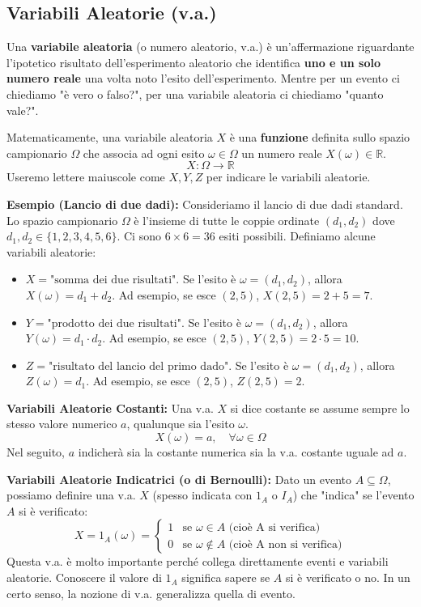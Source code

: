 \subsection{Variabili Aleatorie (v.a.)}
\begin{definition}
Una \textbf{variabile aleatoria} (o numero aleatorio, v.a.) è un'affermazione riguardante l'ipotetico risultato dell'esperimento aleatorio che identifica \textbf{uno e un solo numero reale} una volta noto l'esito dell'esperimento.
Mentre per un evento ci chiediamo "è vero o falso?", per una variabile aleatoria ci chiediamo "quanto vale?".

Matematicamente, una variabile aleatoria $X$ è una \textbf{funzione} definita sullo spazio campionario $\Omega$ che associa ad ogni esito $\omega \in \Omega$ un numero reale $X(\omega) \in \mathbb{R}$.
\[ X: \Omega \to \mathbb{R} \]
Useremo lettere maiuscole come $X, Y, Z$ per indicare le variabili aleatorie.
\end{definition}

\begin{example}
\textbf{Esempio (Lancio di due dadi):}
Consideriamo il lancio di due dadi standard. Lo spazio campionario $\Omega$ è l'insieme di tutte le coppie ordinate $(d_1, d_2)$ dove $d_1, d_2 \in \{1, 2, 3, 4, 5, 6\}$. Ci sono $6 \times 6 = 36$ esiti possibili.
Definiamo alcune variabili aleatorie:
\begin{itemize}
    \item $X = \text{"somma dei due risultati"}$.
    Se l'esito è $\omega = (d_1, d_2)$, allora $X(\omega) = d_1 + d_2$.
    Ad esempio, se esce $(2, 5)$, $X(2,5) = 2+5=7$.
    \item $Y = \text{"prodotto dei due risultati"}$.
    Se l'esito è $\omega = (d_1, d_2)$, allora $Y(\omega) = d_1 \cdot d_2$.
    Ad esempio, se esce $(2, 5)$, $Y(2,5) = 2 \cdot 5=10$.
    \item $Z = \text{"risultato del lancio del primo dado"}$.
    Se l'esito è $\omega = (d_1, d_2)$, allora $Z(\omega) = d_1$.
    Ad esempio, se esce $(2, 5)$, $Z(2,5) = 2$.
\end{itemize}
\end{example}

\textbf{Variabili Aleatorie Costanti:}
Una v.a. $X$ si dice costante se assume sempre lo stesso valore numerico $a$, qualunque sia l'esito $\omega$.
\[ X(\omega) = a, \quad \forall \omega \in \Omega \]
Nel seguito, $a$ indicherà sia la costante numerica sia la v.a. costante uguale ad $a$.

\textbf{Variabili Aleatorie Indicatrici (o di Bernoulli):}
Dato un evento $A \subseteq \Omega$, possiamo definire una v.a. $X$ (spesso indicata con $1_A$ o $I_A$) che "indica" se l'evento $A$ si è verificato:
\[ X = 1_A(\omega) = \begin{cases} 1 & \text{se } \omega \in A \text{ (cioè A si verifica)} \\ 0 & \text{se } \omega \notin A \text{ (cioè A non si verifica)} \end{cases} \]
Questa v.a. è molto importante perché collega direttamente eventi e variabili aleatorie. Conoscere il valore di $1_A$ significa sapere se $A$ si è verificato o no. In un certo senso, la nozione di v.a. generalizza quella di evento.

